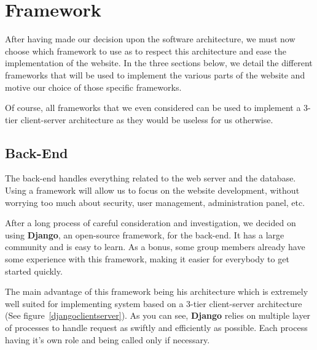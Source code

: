 \section{Framework}

After having made our decision upon the software architecture, we must now
choose which framework to use as to respect this architecture and ease the
implementation of the website. In the three sections below, we detail the
different frameworks that will be used to implement the various parts of
the website and motive our choice of those specific frameworks. \newline

Of course, all frameworks that we even considered can be used to implement
a 3-tier client-server architecture as they would be useless for us
otherwise.

\subsection{Back-End}

The back-end handles everything related to the web server and the database.
Using a framework will allow us to focus on the website development,
without worrying too much about security, user management, administration
panel, etc.\newline

After a long process of careful consideration and investigation, we decided
on using \textbf{Django}, an open-source framework, for the back-end. It
has a large community and is easy to learn. As a bonus, some group members
already have some experience with this framework, making it easier for
everybody to get started quickly.\newline

The main advantage of this framework being his architecture which is
extremely well suited for implementing system based on a 3-tier
client-server architecture (See figure~\ref{djangoclientserver}). As you can see, \textbf{Django}
relies on multiple layer of processes to handle request as swiftly and
efficiently as possible. Each process having it's own role and being called
only if necessary.  \newline

